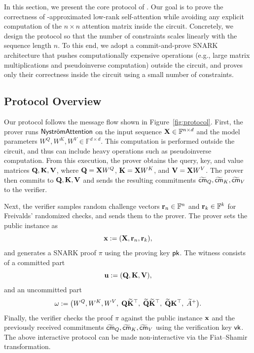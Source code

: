 \documentclass[letterpaper,twocolumn,10pt]{article}
\begin{document}

In this section, we present the core protocol of \name. Our goal is to prove the correctness of \nystrom-approximated low-rank self-attention while avoiding any explicit computation of the $n \times n$ attention matrix inside the circuit. Concretely, we design the protocol so that the number of constraints scales linearly with the sequence length $n$. To this end, we adopt a commit-and-prove SNARK architecture that pushes computationally expensive operations (e.g., large matrix multiplications and pseudoinverse computation) outside the circuit, and proves only their correctness inside the circuit using a small number of constraints.


\subsection{Protocol Overview}
Our protocol follows the message flow shown in Figure~\ref{fig:protocol}.
First, the prover runs $\textsf{Nystr\"omAttention}$ on the input sequence ${\mathbf{X}} \in \mathbb{F}^{n \times d}$ and the model parameters $W^Q, W^K, W^V \in \mathbb{F}^{d \times d}$.
This computation is performed outside the circuit, and thus can include heavy operations such as pseudoinverse computation. From this execution, the prover obtains the query, key, and value matrices ${\mathbf{Q}},{\mathbf{K}},{\mathbf{V}}$, where ${\mathbf{Q}}={\mathbf{X}} W^Q$, ${\mathbf{K}}={\mathbf{X}} W^K$, and ${\mathbf{V}}={\mathbf{X}} W^V$. The prover then commits to ${\mathbf{Q}},{\mathbf{K}},{\mathbf{V}}$ and sends the resulting commitments $\widetilde{{\sf cm}}_Q, \widetilde{{\sf cm}}_K, \widetilde{{\sf cm}}_V$ to the verifier.

Next, the verifier samples random challenge vectors ${\mathbf{r}}_n \in {\mathbb{F}}^n$ and ${\mathbf{r}}_k \in {\mathbb{F}}^k$ for Freivalds' randomized checks, and sends them to the prover.
The prover sets the public instance as
\[
    {\mathbf{x}} := ({\mathbf{X}}, {\mathbf{r}}_n, {\mathbf{r}}_k),
\]
and generates a SNARK proof $\pi$ using the proving key ${\sf pk}$.
The witness consists of a committed part
\[
    {\mathbf{u}} := ({\mathbf{Q}},{\mathbf{K}},{\mathbf{V}}),
\]
and an uncommitted part
\[
    {\mathbf{\omega}} := \bigl(W^Q, W^K, W^V,\; {\mathbf{Q}}\widetilde{{\mathbf{K}}}^{\top},\; \widetilde{{\mathbf{Q}}}\widetilde{{\mathbf{K}}}^{\top},\; \widetilde{{\mathbf{Q}}}{\mathbf{K}}^{\top},\; \widetilde{A}^{+}\bigr).
\]
Finally, the verifier checks the proof $\pi$ against the public instance ${\mathbf{x}}$ and the previously received commitments
$\widetilde{{\sf cm}}_Q, \widetilde{{\sf cm}}_K, \widetilde{{\sf cm}}_V$ using the verification key ${\sf vk}$.
The above interactive protocol can be made non-interactive via the Fiat--Shamir transformation.
\end{document}
